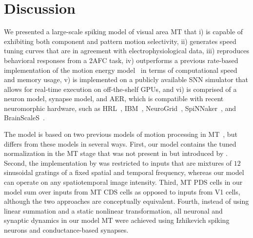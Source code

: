 \section{Discussion}
We presented a large-scale spiking model of visual area \ac{MT}
that i) is capable of exhibiting both component and pattern
motion selectivity, ii) generates speed tuning curves that are in
agreement with electrophysiological data, iii) reproduces behavioral
responses from a 2AFC task, iv) outperforms a previous
rate-based implementation of the motion energy 
model~\citep{SimoncelliHeeger1998} in terms of computational
speed and memory usage, v) is implemented on a publicly
available \ac{SNN} simulator that allows for real-time execution
on off-the-shelf \acp{GPU}, and vi) is comprised of a neuron model,
synapse model, and \ac{AER},
which is compatible with recent neuromorphic 
hardware, such as HRL~\citep{Srinivasa2012}, IBM~\citep{Cassidy2014},
NeuroGrid~\citep{Boahen2006}, SpiNNaker~\citep{Khan2008}, and
BrainScaleS~\citep{Schemmel2010}.

The model is based on two previous models of motion
processing in 
\ac{MT}~\citep{SimoncelliHeeger1998,Rust2006},
but differs from these models in several ways. First, our
model contains the tuned normalization in the \ac{MT} stage that
was not present in \cite{SimoncelliHeeger1998} but introduced
by \cite{Rust2006}. Second, the implementation by \cite{Rust2006}
was restricted to inputs that are mixtures of
$12$ sinusoidal gratings of a fixed spatial and temporal frequency,
whereas our model can operate on any spatiotemporal
image intensity. Third, \ac{MT} \ac{PDS} cells in our model sum over
inputs from \ac{MT} \ac{CDS} cells as opposed to inputs from
\ac{V1} cells, although the two approaches are conceptually equivalent.
Fourth, instead of using linear summation and a static nonlinear
transformation, all neuronal and synaptic dynamics in our
model \ac{MT} were achieved using Izhikevich spiking neurons
and conductance-based synapses.

